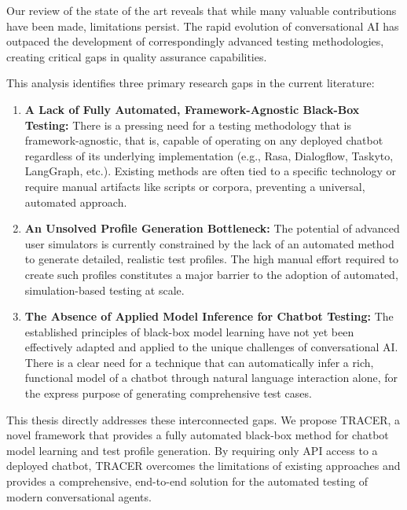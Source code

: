 Our review of the state of the art
reveals that while many valuable contributions have been made,
limitations persist.
The rapid evolution of conversational AI
has outpaced the development of
correspondingly advanced testing methodologies,
creating critical gaps in quality assurance capabilities.

This analysis identifies three primary research gaps in the current literature:
\begin{enumerate}
    \item \textbf{A Lack of Fully Automated, Framework-Agnostic Black-Box Testing:}
      There is a pressing need for a testing methodology
      that is framework-agnostic, that is,
      capable of operating on any deployed chatbot
      regardless of its underlying implementation
      (e.g., Rasa, Dialogflow, Taskyto, LangGraph, etc.).
      Existing methods are often tied to a specific technology
      or require manual artifacts like scripts or corpora,
      preventing a universal, automated approach.

    \item \textbf{An Unsolved Profile Generation Bottleneck:}
      The potential of advanced user simulators
      is currently constrained by the lack of an automated method
      to generate detailed, realistic test profiles.
      The high manual effort required to create such profiles
      constitutes a major barrier
      to the adoption of automated, simulation-based testing at scale.

    \item \textbf{The Absence of Applied Model Inference for Chatbot Testing:}
      The established principles of black-box model learning
      have not yet been effectively adapted and applied
      to the unique challenges of conversational \ac{AI}.
      There is a clear need for a technique
      that can automatically infer a rich, functional model of a chatbot
      through natural language interaction alone,
      for the express purpose of generating comprehensive test cases.

\end{enumerate}

This thesis directly addresses these interconnected gaps.
We propose \ac{TRACER}, a novel framework
that provides a fully automated black-box method
for chatbot model learning and test profile generation.
By requiring only \ac{API} access to a deployed chatbot,
\ac{TRACER} overcomes the limitations of existing approaches
and provides a comprehensive, end-to-end solution
for the automated testing of modern conversational agents.
